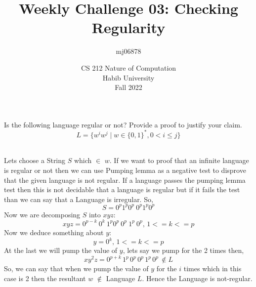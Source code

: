 \documentclass[a4paper]{exam}
\title{Weekly Challenge 03: Checking Regularity}
\author{mj06878} %
\date{CS 212 Nature of Computation\\Habib University\\Fall 2022}
\begin{document}
\maketitle

\begin{questions}
  

  Is the following language regular or not? Provide a proof to justify your claim.
  \[
    L = \{ w^iw^j \mid w\in\{0,1\}^*, 0 < i \leq j \}
  \]
  
  \begin{solution}
    \\ 
    Lets choose a String \(S\) which \(\in\) \(w\). If we want to proof that an infinite language is regular or not then we can use Pumping lemma as a negative test to disprove that the given language is not regular. If a language passes the pumping lemma test then this is not decidable that a language is regular but if it fails the test than we can say that a Language is irregular. So, \\ 
    \[S = 0^{p} 1^{p} 0^{p} \ 0^{p} 1^{p} 0^{p} \]
    Now we are decomposing \(S\) into \(xyz\): \\ 
    \[xyz = 0^{p-k} \ 0^{k} \ 1^{p} 0^{p} \ 0^{p} \ 1^{p} \ 0^{p}, \, 1<=k<= p\]
    Now we deduce something about \(y\):
    \[y=0^{k}, \, 1<= k<=p  \]
    At the last we will pump the value of \(y\), lets say we pump for the 2 times then, 
    \[xy^{2}z =0^{p+k} \, 1^{p} \, 0^{p} \, 0^{p} \, 1^{p} \, 0^{p} \, \notin L\]
    So, we can say that when we pump the value of \(y\) for the \(i\) times which in this case is 2 then the resultant \(w\) \(\notin\) Language \(L\). Hence the Language is not-regular.
    
    
  \end{solution}
\end{questions}
\end{document}
